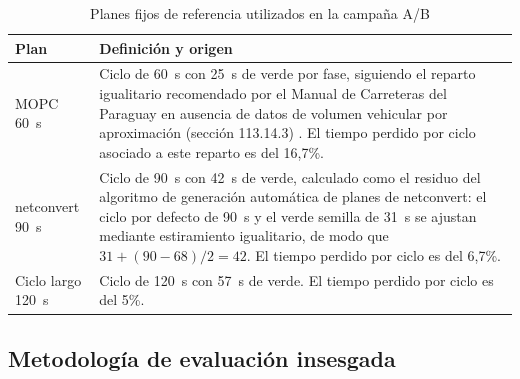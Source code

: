 \begin{table}[htbp]
\renewcommand{\arraystretch}{1.3}
\caption{Planes fijos de referencia utilizados en la campaña A/B}
\label{tab:control_planes}
\centering
\footnotesize
\begin{tabular}{lp{}}
\hline
\textbf{Plan} & \textbf{Definición y origen} \\
\hline
MOPC 60~s      & Ciclo de 60~s con 25~s de verde por fase, siguiendo el reparto igualitario
                 recomendado por el Manual de Carreteras del Paraguay en ausencia de datos
                 de volumen vehicular por aproximación (sección 113.14.3) \cite{mopc2019manual}.
                 El tiempo perdido por ciclo asociado a este reparto es del 16,7\%. \\
netconvert 90~s & Ciclo de 90~s con 42~s de verde, calculado como el residuo del algoritmo
                 de generación automática de planes de netconvert: el ciclo por defecto
                 de 90~s y el verde semilla de 31~s se ajustan mediante estiramiento
                 igualitario, de modo que
                 $31+(90-68)/2=42$. El tiempo perdido por ciclo es del 6,7\%. \\
Ciclo largo 120~s & Ciclo de 120~s con 57~s de verde. El tiempo perdido por ciclo es del 5\%. \\
\hline
\end{tabular}
\end{table}

\subsection{Metodología de evaluación insesgada}
\label{subsec:control_metodologia}


